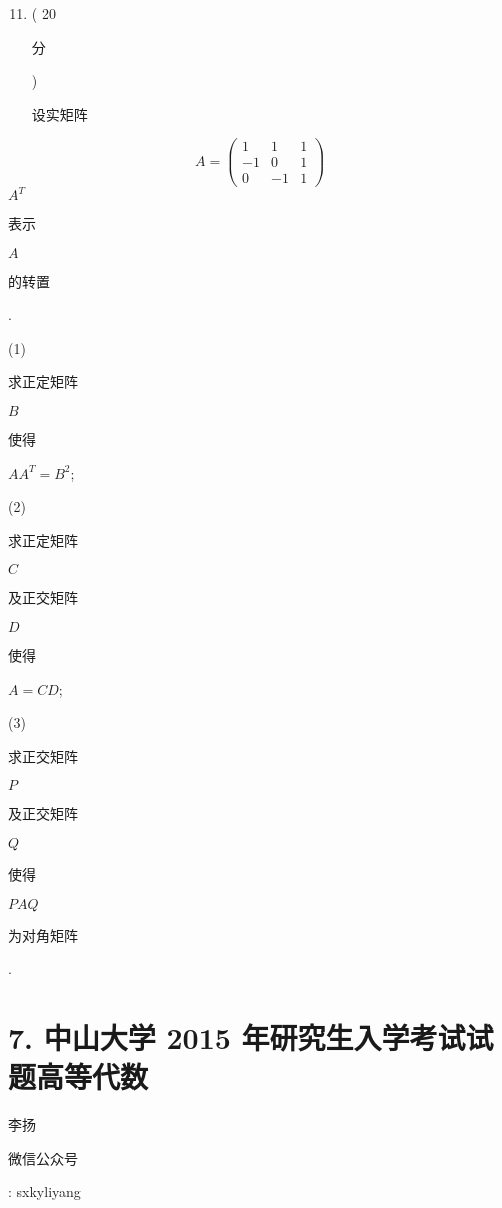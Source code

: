 \documentclass[10pt]{article}
\begin{document}
\begin{enumerate}
  \setcounter{enumi}{10}
  \item ( 20 \begin{CJK}{UTF8}{mj}分\end{CJK}) \begin{CJK}{UTF8}{mj}设实矩阵\end{CJK}
\end{enumerate}
$$
A=\left(\begin{array}{ccc}
1 & 1 & 1 \\
-1 & 0 & 1 \\
0 & -1 & 1
\end{array}\right)
$$
$A^{T}$ \begin{CJK}{UTF8}{mj}表示\end{CJK} $A$ \begin{CJK}{UTF8}{mj}的转置\end{CJK}.

(1) \begin{CJK}{UTF8}{mj}求正定矩阵\end{CJK} $B$ \begin{CJK}{UTF8}{mj}使得\end{CJK} $A A^{T}=B^{2}$;

(2) \begin{CJK}{UTF8}{mj}求正定矩阵\end{CJK} $C$ \begin{CJK}{UTF8}{mj}及正交矩阵\end{CJK} $D$ \begin{CJK}{UTF8}{mj}使得\end{CJK} $A=C D$;

(3) \begin{CJK}{UTF8}{mj}求正交矩阵\end{CJK} $P$ \begin{CJK}{UTF8}{mj}及正交矩阵\end{CJK} $Q$ \begin{CJK}{UTF8}{mj}使得\end{CJK} $P A Q$ \begin{CJK}{UTF8}{mj}为对角矩阵\end{CJK}.

\section{7. 中山大学 2015 年研究生入学考试试题高等代数}
\begin{CJK}{UTF8}{mj}李扬\end{CJK}

\begin{CJK}{UTF8}{mj}微信公众号\end{CJK}: sxkyliyang
\end{document}

